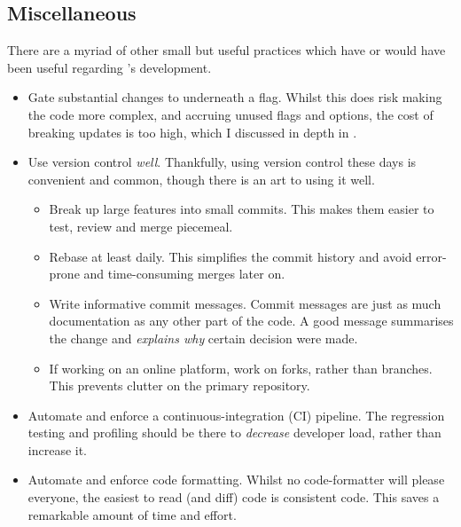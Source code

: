 \subsection{Miscellaneous}

There are a myriad of other small but useful practices which have or would have
been useful regarding 's development.
\begin{itemize}
    \item Gate substantial changes to  underneath a flag. Whilst this
        does risk making the code more complex, and accruing unused flags and
        options, the cost of breaking updates is too high, which I discussed in
        depth in .
    \item Use version control \emph{well}. Thankfully, using version control
        these days is convenient and common, though there is an art to
        using it well.
        \begin{itemize}
            \item Break up large features into small commits. This makes them
                easier to test, review and merge piecemeal.
            \item Rebase at least daily. This simplifies the commit history and
                avoid error-prone and time-consuming merges later on.
            \item Write informative commit messages. Commit messages are just
                as much documentation as any other part of the code. A good
                message summarises the change and \emph{explains why}
                certain decision were made.
            \item If working on an online platform, work on forks, rather than
                branches. This prevents clutter on the primary repository.
        \end{itemize}
    \item Automate and enforce a continuous-integration (CI) pipeline. The
        regression testing and profiling should be there to \emph{decrease}
        developer load, rather than increase  it.
    \item Automate and enforce code formatting. Whilst no code-formatter will
        please everyone, the easiest to read (and diff) code is consistent
        code. This saves a remarkable amount of time and effort.
\end{itemize}

